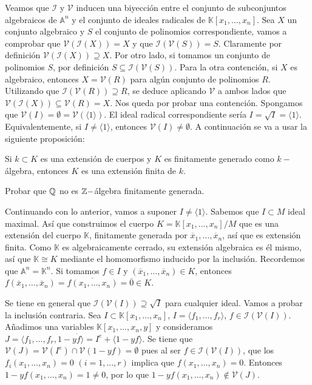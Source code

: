\documentclass[ACGA.tex]{subfiles}
\begin{document}
Veamos que $\mathcal{I}$ y $\mathcal{V}$ inducen una biyección entre el conjunto de subconjuntos algebraicos de $\mathbb{A}^n$ y el conjunto de ideales radicales de $\mathbb{K}[x_1,\dots,x_n]$. Sea $X$ un conjunto algebraico y $S$ el conjunto de polinomios correspondiente, vamos a comprobar que $\mathcal{V}(\mathcal{I}(X))=X$ y que $\mathcal{I}(\mathcal{V}(S))=S$. Claramente por definición $\mathcal{V}(\mathcal{I}(X))\supseteq X$. Por otro lado, si tomamos un conjunto de polinomios $S$, por definición $S\subseteq \mathcal{I}(\mathcal{V}(S))$. Para la otra contención, si $X$ es algebraico, entonces $X=\mathcal{V}(R)$ para algún conjunto de polinomios $R$. Utilizando que $\mathcal{I}(\mathcal{V}(R))\supseteq R$, se deduce aplicando $\mathcal{V}$ a ambos lados que $\mathcal{V}(\mathcal{I}(X))\subseteq \mathcal{V}(R)=X$. Nos queda por probar una contención. Spongamos que $\mathcal{V}(I)=\emptyset=\mathcal{V}(\langle 1\rangle)$. El ideal radical correspondiente sería $I=\sqrt{I}=\langle1 \rangle$. Equivalentemente, si $I\neq\langle 1\rangle$, entonces $\mathcal{V}(I)\neq\emptyset$. A continuación se va a usar la siguiente proposición:
\begin{prop}
Si $k\subset K$ es una extensión de cuerpos y $K$ es finitamente generado como $k-$álgebra, entonces $K$ es una extensión finita de $k$. 
\end{prop}

\begin{ejer}
Probar que $\mathbb{Q}$ no es $\mathbb{Z}-$álgebra finitamente generada. 
\end{ejer}

Continuando con lo anterior, vamos a suponer $I\neq\langle 1\rangle$. Sabemos que $I\subset M$ ideal maximal. Así que construimos el cuerpo $K=\mathbb{K}[x_1,\dots,x_n]/M$ que es una extensión del cuerpo $\mathbb{K}$, finitamente generada por $\overline{x}_1,\dots, \overline{x}_n$, así que es extensión finita. Como $\mathbb{K}$ es algebraicamente cerrado, su extensión algebraica es él mismo, así que $\mathbb{K}\cong K$ mediante el homomorfismo inducido por la inclusión. Recordemos que $\mathbb{A}^n=\mathbb{K}^n$. Si tomamos $f\in I$ y $(\overline{x}_1,\dots, \overline{x}_n)\in K$, entonces $f(\overline{x}_1,\dots, \overline{x}_n)=\overline{f(x_1,\dots,x_n)}=\overline{0}\in K$. 

Se tiene en general que $\mathcal{I}(\mathcal{V}(I))\supseteq\sqrt{I}$ para cualquier ideal. Vamos a probar la inclusión contraria. Sea $I\subset \mathbb{K}[x_1,\dotsc,x_n]$, $I=\langle f_1,\dotsc,f_r\rangle$, $f\in \mathcal{I}(\mathcal{V}(I))$. Añadimos una variables $\mathbb{K}[x_1,\dotsc,x_n,y]$ y consideramos $J=\langle f_1,\dotsc,f_r,1-y\dot f\rangle = I^e + \langle 1-yf\rangle$. Se tiene que $\mathcal{V}(J) = \mathcal{V}(I^e) \cap \mathcal{V}(1-yf)=\emptyset$ pues al ser $f\in \mathcal{I}(\mathcal{V}(I))$, que los $f_i(x_1,\dots, x_n)=0$ $(i=1,\dots,r)$ implica que $f(x_1,\dotsc,x_n)=0$. Entonces $1-yf(x_1,\dotsc,x_n) = 1\neq 0$, por lo que $1-yf(x_1,\dotsc,x_n)\notin\mathcal{V}(J)$. 
\end{document}

